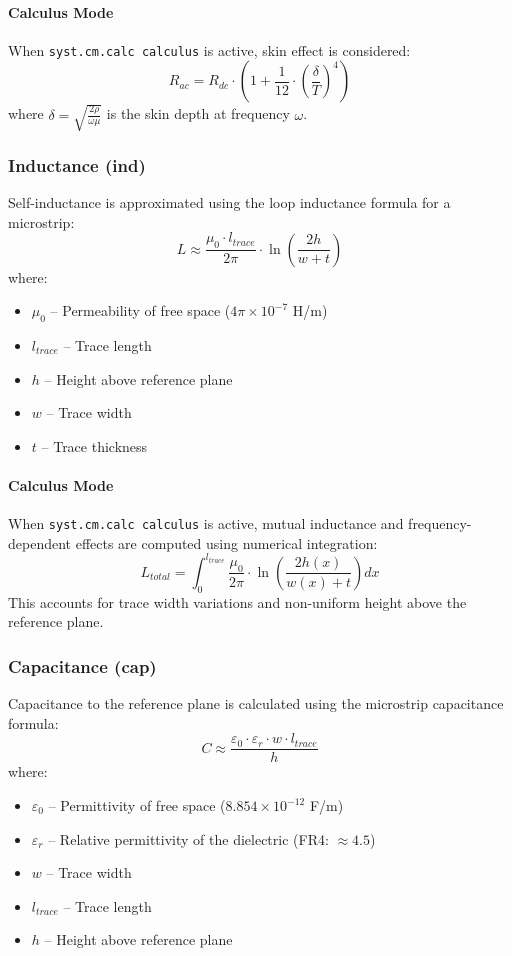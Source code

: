 \documentclass{report}
\begin{document}
\paragraph{Calculus Mode}
When \texttt{syst.cm.calc calculus} is active, skin effect is considered:
\begin{equation}
R_{ac} = R_{dc} \cdot \left(1 + \frac{1}{12} \cdot \left(\frac{\delta}{T}\right)^4\right)
\end{equation}
where $\delta = \sqrt{\frac{2\rho}{\omega\mu}}$ is the skin depth at frequency $\omega$.

\subsubsection{Inductance (ind)}
Self-inductance is approximated using the loop inductance formula for a microstrip:
\begin{equation}
L \approx \frac{\mu_0 \cdot l_{trace}}{2\pi} \cdot \ln\left(\frac{2h}{w + t}\right)
\end{equation}
where:
\begin{itemize}
\item $\mu_0$ -- Permeability of free space ($4\pi \times 10^{-7}$ H/m)
\item $l_{trace}$ -- Trace length
\item $h$ -- Height above reference plane
\item $w$ -- Trace width
\item $t$ -- Trace thickness
\end{itemize}

\paragraph{Calculus Mode}
When \texttt{syst.cm.calc calculus} is active, mutual inductance and frequency-dependent effects are computed using numerical integration:
\begin{equation}
L_{total} = \int_0^{l_{trace}} \frac{\mu_0}{2\pi} \cdot \ln\left(\frac{2h(x)}{w(x) + t}\right) dx
\end{equation}
This accounts for trace width variations and non-uniform height above the reference plane.

\subsubsection{Capacitance (cap)}
Capacitance to the reference plane is calculated using the microstrip capacitance formula:
\begin{equation}
C \approx \frac{\varepsilon_0 \cdot \varepsilon_r \cdot w \cdot l_{trace}}{h}
\end{equation}
where:
\begin{itemize}
\item $\varepsilon_0$ -- Permittivity of free space ($8.854 \times 10^{-12}$ F/m)
\item $\varepsilon_r$ -- Relative permittivity of the dielectric (FR4: $\approx 4.5$)
\item $w$ -- Trace width
\item $l_{trace}$ -- Trace length
\item $h$ -- Height above reference plane
\end{itemize}
\end{document}
